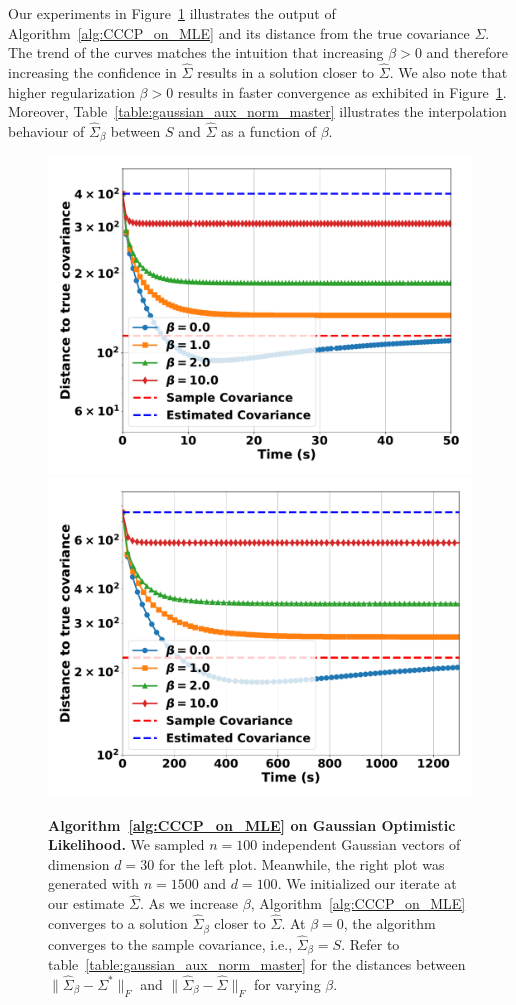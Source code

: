 \documentclass[sn-nature]{sn-jnl}%
\theoremstyle{thmstyleone}%
\theoremstyle{thmstyletwo}%
\theoremstyle{thmstylethree}%
\begin{document}
Our experiments in Figure~\ref{fig:Gaussian_aux_mle_30}
illustrates the output of Algorithm~\ref{alg:CCCP_on_MLE} and its distance from the true covariance $\Sigma$. The trend of the curves matches the intuition that increasing $\beta > 0$ and therefore increasing the confidence in $\hat{\Sigma}$ results in a solution closer to $\hat{\Sigma}$. We also note that higher regularization $\beta > 0$ results in faster convergence as exhibited in Figure~\ref{fig:Gaussian_aux_mle_30}. Moreover, Table~\ref {table:gaussian_aux_norm_master} illustrates the interpolation behaviour of $\hat{\Sigma}_\beta$ between $S$ and $\hat{\Sigma}$ as a function of $\beta$.


\begin{figure}
    \centering
    \includegraphics[width=0.43\linewidth]{figuresV2/Gaussian_MLE/cccp_gaussianMLE_30.pdf}
    \includegraphics[width=0.43 \linewidth]{figuresV2/Gaussian_MLE/cccp_gaussianMLE_100.pdf}
    \caption{\textbf{Algorithm~\ref{alg:CCCP_on_MLE} on Gaussian Optimistic Likelihood.} We sampled $n=100$ independent Gaussian vectors of dimension $d=30$ for the left plot. Meanwhile, the right plot was generated with $n=1500$ and $d=100$. We initialized our iterate at our estimate $\hat{\Sigma}$.
    As we increase $\beta$, Algorithm~\ref{alg:CCCP_on_MLE} converges to a solution $\hat{\Sigma}_\beta$ closer to $\hat{\Sigma}$. At $\beta = 0$, the algorithm converges to the sample covariance, i.e., $\hat{\Sigma}_\beta = S$. Refer to table~\ref{table:gaussian_aux_norm_master} for the distances between $\|\hat{\Sigma}_\beta  - \Sigma^*\|_F$ and $\|\hat{\Sigma}_\beta - \hat{\Sigma}\|_F$ for varying $\beta$.}
    \label{fig:Gaussian_aux_mle_30}
\end{figure}
\end{document}
